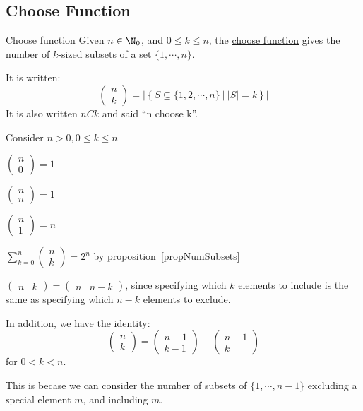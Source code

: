 \documentclass[../Main.tex]{subfiles}
\begin{document}
\subsection{Choose Function}
\begin{definition}{Choose function}
    Given $n \in \N_0$, and $0 \leq k \leq n$, the \underline{choose function} gives the number of $k$-sized subsets of a set $\{1, \cdots, n\}$.\par
    It is written:
    \begin{equation*}
        \begin{pmatrix}n \\ k\end{pmatrix} = \left|\left\{S \subseteq \{1, 2, \cdots, n\}~|~|S|=k\right\}\right|
    \end{equation*}
    It is also written $nCk$ and said ``n choose k''.
\end{definition}
\begin{examples}{
        Consider $n > 0, 0 \leq k \leq n$
    }
    \item $\begin{pmatrix}n \\ 0\end{pmatrix} = 1$
    \item $\begin{pmatrix}n \\ n\end{pmatrix} = 1$
    \item $\begin{pmatrix}n \\ 1\end{pmatrix} = n$
    \item $\sum_{k=0}^n \begin{pmatrix}n \\ k\end{pmatrix} = 2^n$ by proposition~\ref{propNumSubsets}
    \item $\begin{pmatrix}n & k\end{pmatrix} = \begin{pmatrix}n & n - k\end{pmatrix}$, since specifying which $k$ elements to include is the same as specifying which $n - k$ elements to exclude.
\end{examples}
\begin{example}
    In addition, we have the identity:
    \begin{equation}
        \begin{pmatrix}n \\ k\end{pmatrix} = \begin{pmatrix}n - 1 \\ k - 1\end{pmatrix} + \begin{pmatrix}n - 1 \\ k\end{pmatrix}
        \label{eqnChooseAsSum}
    \end{equation}
    for $0 < k < n$.\par
    This is becase we can consider the number of subsets of $\{1, \cdots, n-1\}$ excluding a special element $m$, and including $m$.
\end{example}
\end{document}
